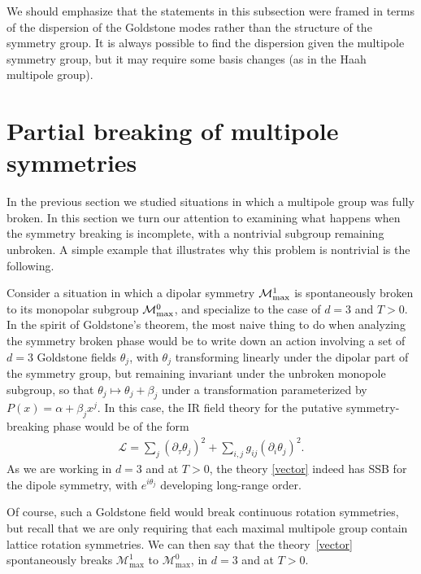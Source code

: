 \documentclass[prb,aps,twocolumn, amsfonts,amsmath,amssymb,nofootinbib,superscriptaddress]{revtex4-2}
\renewcommand{\max}{\text{max}}
\newcommand{\mmax}[1]{\mathcal{M}^{#1}_\max}
\renewcommand{\t}{\theta}
\newcommand{\mcm}{\mathcal{M}}
\begin{document}
We should emphasize that the statements in this subsection were framed in terms of the dispersion of the Goldstone modes rather than the structure of the symmetry group. It is always possible to find the dispersion given the multipole symmetry group, but it may require some basis changes (as in the Haah multipole group).

\section{Partial breaking of multipole symmetries} \label{sec:partial}

In the previous section we studied situations in which a multipole group was fully broken. In this section we turn our attention to examining what happens when the symmetry breaking is incomplete, with a nontrivial subgroup remaining unbroken. A simple example that illustrates why this problem is nontrivial is the following. 
 
Consider a situation in which a dipolar symmetry $\mcm^1_{\rm max}$ is spontaneously broken to its monopolar subgroup $\mcm^0_{\rm max}$, and specialize to the case of $d=3$ and $T>0$. In the spirit of Goldstone's theorem, the most naive thing to do when analyzing the symmetry broken phase would be to write down an action involving a set of $d=3$ Goldstone fields $\theta_j$, with $\t_j$ transforming linearly under the dipolar part of the symmetry group, but remaining invariant under the unbroken monopole subgroup, so that $\theta_j \mapsto \theta_j + \beta_j$ under a transformation parameterized by $P(x) = \alpha + \beta_j x^j$. In this case, the IR field theory for the putative symmetry-breaking phase would be of the form 
\begin{align}
\label{vector} \mathcal{L}= \sum_j  (\partial_\tau \theta_j)^2 + \sum_{i,j} g_{ij} (\partial_i \theta_j)^2.
\end{align}
As we are working in $d=3$ and at $T>0$, the theory \eqref{vector} indeed has SSB for the dipole symmetry, with $e^{i\t_j}$ developing long-range order. 

Of course, such a Goldstone field would break continuous rotation symmetries, but recall that we are only requiring that each maximal multipole group contain lattice rotation symmetries. We can then say that the theory~\eqref{vector} spontaneously breaks $\mmax{1}$ to $\mmax{0}$, in $d=3$ and at $T>0$.
\end{document}
